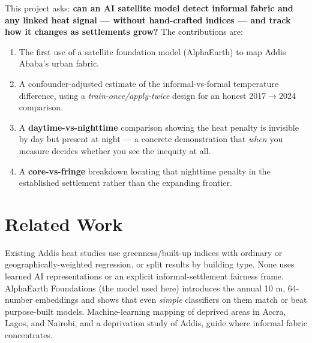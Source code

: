 \documentclass[11pt]{article}
\begin{document}
This project asks: \textbf{can an AI satellite model detect informal fabric and
any linked heat signal --- without hand-crafted indices --- and track how it
changes as settlements grow?} The contributions are:
\begin{enumerate}[leftmargin=1.4em, itemsep=1pt]
  \item The first use of a satellite foundation model (AlphaEarth) to map Addis
  Ababa's urban fabric.
  \item A confounder-adjusted estimate of the informal-vs-formal temperature
  difference, using a \emph{train-once/apply-twice} design for an honest
  2017$\rightarrow$2024 comparison.
  \item A \textbf{daytime-vs-nighttime} comparison showing the heat penalty is
  invisible by day but present at night --- a concrete demonstration that
  \emph{when} you measure decides whether you see the inequity at all.
  \item A \textbf{core-vs-fringe} breakdown locating that nighttime penalty in
  the established settlement rather than the expanding frontier.
\end{enumerate}

\section{Related Work}
Existing Addis heat studies use greenness/built-up indices with ordinary or
geographically-weighted regression, or split results by building type. None
uses learned AI representations or an explicit informal-settlement fairness
frame. AlphaEarth Foundations (the model used here) introduces the annual
10 m, 64-number embeddings and shows that even \emph{simple} classifiers on
them match or beat purpose-built models. Machine-learning mapping of deprived
areas in Accra, Lagos, and Nairobi, and a deprivation study of Addis, guide
where informal fabric concentrates.

\end{document}
